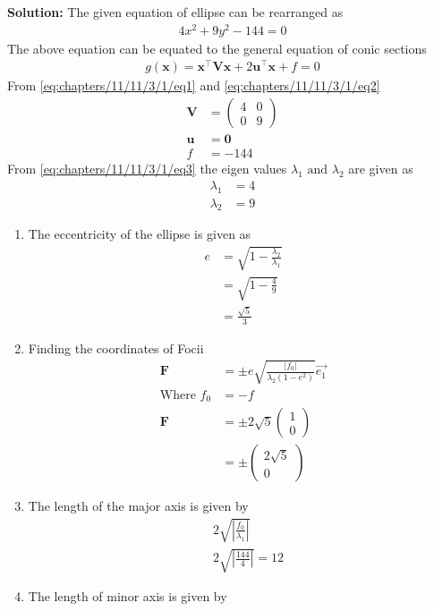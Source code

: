 \documentclass[12pt]{article}
\providecommand{\brak}[1]{\ensuremath{\left(#1\right)}}
\providecommand{\abs}[1]{\left\vert#1\right\vert}
\newcommand{\solution}{\noindent \textbf{Solution: }}
\newcommand{\myvec}[1]{\ensuremath{\begin{pmatrix}#1\end{pmatrix}}}
\let\vec\mathbf
\begin{document}
\begin{enumerate}
\solution
\fi
The given equation of ellipse can be rearranged as 
\begin{align}
 4x^2+9y^2-144=0\label{eq:chapters/11/11/3/1/eq1}
\end{align}
The above equation can be equated to the general equation of conic sections
\begin{align}
 g\brak{\vec{x}}=\vec{x}^\top \vec{V} \vec{x} + 2\vec{u}^\top \vec{x} + f = 0\label{eq:chapters/11/11/3/1/eq2}
\end{align}
From \eqref{eq:chapters/11/11/3/1/eq1} and \eqref{eq:chapters/11/11/3/1/eq2}
\begin{align}
 \vec{V} &= \myvec{4&0\\0&9}\label{eq:chapters/11/11/3/1/eq3}\\
 \vec{u} &= \vec{0}\\
 f &= -144
\end{align}
From \eqref{eq:chapters/11/11/3/1/eq3} the eigen values $\lambda_1 \text{ and } \lambda_2$ are given as
\begin{align}
 \lambda_1 &= 4\\
 \lambda_2 &= 9
\end{align}
\begin{enumerate}
\item The eccentricity of the ellipse is given as
\begin{align}
 e &= \sqrt{1 - \frac{\lambda_2}{\lambda_1}} \\
          &= \sqrt{1-\frac{4}{9}}\\
   &= \frac{\sqrt{5}}{3}
\end{align}
\item Finding the coordinates of Focii
\begin{align}
 \vec{F} &= \pm e\sqrt{\frac{\abs{f_0}}{\lambda_2\brak{1-e^2}}}\Vec{e_1}\\
\text{Where }f_0 &=-f\\
 \vec{F} &= \pm2\sqrt{5}\myvec{1\\0}\\
	&= \pm\myvec{2\sqrt{5}\\0}
\end{align}
\item The length of the major axis is given by
\begin{align}
 &2\sqrt{\abs{\frac{f_0}{\lambda_1}}}\\
        &2\sqrt{\abs{\frac{144}{4}}}= 12
\end{align}
\item The length of minor axis is given by
\begin{align}

\end{align}
\end{enumerate}
\end{enumerate}
\end{document}

